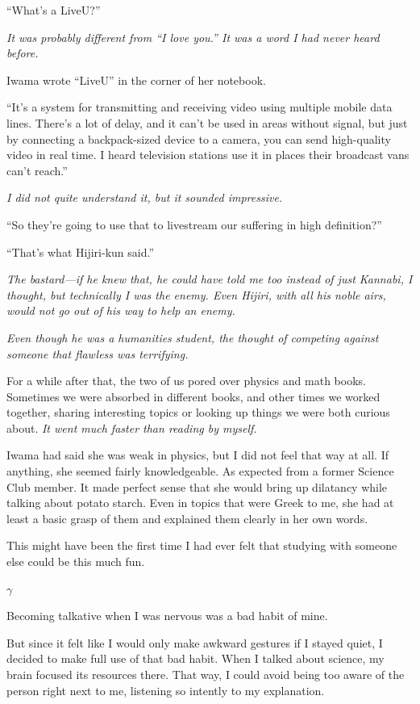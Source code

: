 \documentclass[
    a4paper,
    12pt,
    twoside,
    openany,
    UTF8,
    fontset=windows
]{ctexbook}
\begin{document}
``What's a LiveU?''

\textit{It was probably different from ``I love you.'' It was a word I had never heard before.}

Iwama wrote ``LiveU'' in the corner of her notebook.

``It's a system for transmitting and receiving video using multiple mobile data lines. There's a lot of delay, and it can't be used in areas without signal, but just by connecting a backpack-sized device to a camera, you can send high-quality video in real time. I heard television stations use it in places their broadcast vans can't reach.''

\textit{I did not quite understand it, but it sounded impressive.}

``So they're going to use that to livestream our suffering in high definition?''

``That's what Hijiri-kun said.''

\textit{The bastard---if he knew that, he could have told me too instead of just Kannabi, I thought, but technically I was the enemy. Even Hijiri, with all his noble airs, would not go out of his way to help an enemy.}

\textit{Even though he was a humanities student, the thought of competing against someone that flawless was terrifying.}

For a while after that, the two of us pored over physics and math books. Sometimes we were absorbed in different books, and other times we worked together, sharing interesting topics or looking up things we were both curious about. \textit{It went much faster than reading by myself.}

Iwama had said she was weak in physics, but I did not feel that way at all. If anything, she seemed fairly knowledgeable. As expected from a former Science Club member. It made perfect sense that she would bring up dilatancy while talking about potato starch. Even in topics that were Greek to me, she had at least a basic grasp of them and explained them clearly in her own words.

This might have been the first time I had ever felt that studying with someone else could be this much fun.

$\gamma$

Becoming talkative when I was nervous was a bad habit of mine.

But since it felt like I would only make awkward gestures if I stayed quiet, I decided to make full use of that bad habit. When I talked about science, my brain focused its resources there. That way, I could avoid being too aware of the person right next to me, listening so intently to my explanation.
\end{document}
